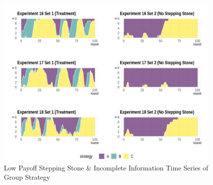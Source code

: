 \begin{figure}[h]
\captionsetup{justification=centering}
  \caption[caption]{Low Payoff Stepping Stone \& Incomplete Information Time Series of Group Strategy}
   \label{fig:Series3I}
    \includegraphics[width = \textwidth]{Images/AllAreaPlot3I.png}
    
\end{figure}

